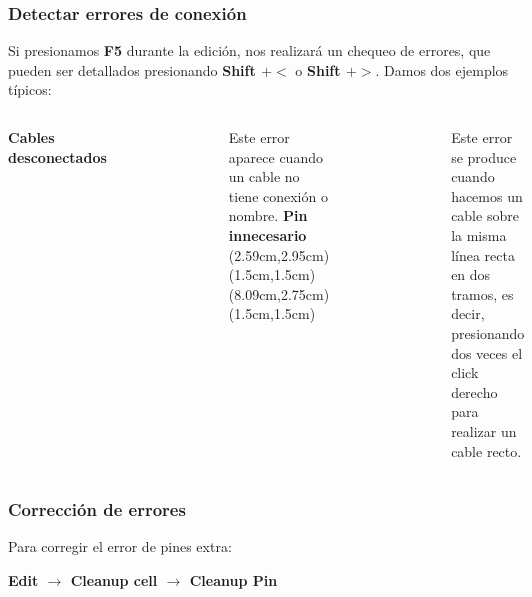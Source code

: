 \documentclass{beamer}
\begin{document}

\begin{frame}
\frametitle{Detectar errores de conexión}
Si presionamos \textbf{F5} durante la edición, nos realizará un chequeo de errores, que pueden ser detallados presionando \textbf{Shift $+<$} o \textbf{Shift $+>$}. Damos dos ejemplos típicos:
\begin{columns}[t]
\textbf{Cables desconectados}
\begin{figure}
  \includegraphics[width=1.0\linewidth]{figuras/edicionElectric-4g.png}
\end{figure}
\scriptsize{Este error aparece cuando un cable no tiene conexión o nombre.} 
\textbf{Pin innecesario}
(2.59cm,2.95cm)(1.5cm,1.5cm)
(8.09cm,2.75cm)(1.5cm,1.5cm)
\begin{figure}
\includegraphics[width=1.0\linewidth]{figuras/edicionElectric-4h.png} 
\end{figure}
\scriptsize{Este error se produce cuando hacemos un cable sobre la misma línea recta en dos tramos, es decir, presionando dos veces el click derecho para realizar un cable recto.} 
\end{columns}
\end{frame}

\begin{frame}
\frametitle{Corrección de errores}
Para corregir el error de pines extra:

\textbf{Edit $\rightarrow$ Cleanup cell $\rightarrow$ Cleanup Pin}

\end{frame}
\end{document}
